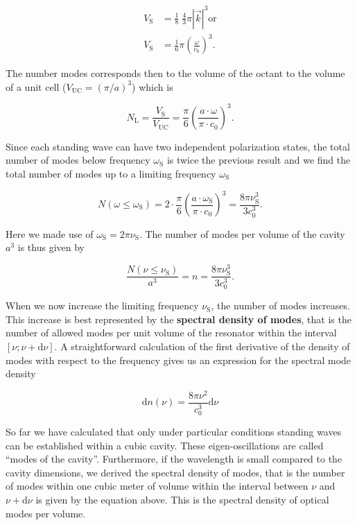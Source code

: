 \documentclass[
  a4paper,
]{book}
\begin{document}
\[
\begin{aligned}
V_{\mathrm{S}} & = \frac{1}{8} \; \frac{4}{3} \pi \left| \vec{k} \right|^3 \mathrm{ or }\\
V_{\mathrm{S}} & = \frac{1}{6} \pi \left( \frac{\omega}{c_0} \right)^3 \mathrm{.}
\end{aligned}
\]

The number modes corresponds then to the volume of the octant to the
volume of a unit cell (\(V_{\mathrm{UC}} = \left( \pi / a \right)^3\))
which is

\[
N_{\mathrm{L}} = \frac{V_{\mathrm{S}}}{V_{\mathrm{UC}}} = \frac{\pi}{6} \left( \frac{a \cdot \omega}{\pi \cdot c_0} \right)^3 \mathrm{.}
\]

Since each standing wave can have two independent polarization states,
the total number of modes below frequency \(\omega_{\mathrm{S}}\) is
twice the previous result and we find the total number of modes up to a
limiting frequency \(\omega_{\mathrm{S}}\)

\[
N \left( \omega \le \omega_{\mathrm{S}} \right) = 2 \cdot \frac{\pi}{6} \left( \frac{a \cdot \omega_{\mathrm{S}}}{\pi \cdot c_0} \right)^3 = \frac{8 \pi \nu_{\mathrm{S}}^3}{3 c_0^3} \mathrm{.}
\]

Here we made use of \(\omega_{\mathrm{S}} = 2 \pi \nu_{\mathrm{S}}\).
The number of modes per volume of the cavity \(a^3\) is thus given by

\[
\frac{N \left( \nu \le \nu_{\mathrm{S}} \right) }{a^3} = n = \frac{8 \pi \nu_{\mathrm{S}}^3}{3 c_0^3} \mathrm{.}
\]

When we now increase the limiting frequency \(\nu_{\mathrm{S}}\), the
number of modes increases. This increase is best represented by the
\textbf{spectral density of modes}, that is the number of allowed modes
per unit volume of the resonator within the interval
\(\left[ \nu ; \nu + \mathrm{d}\nu \right]\). A straightforward
calculation of the first derivative of the density of modes with respect
to the frequency gives us an expression for the spectral mode density

\[
\mathrm{d}n(\nu) = \frac{8 \pi \nu^2}{c_0^3} \mathrm{d}\nu
\]

So far we have calculated that only under particular conditions standing
waves can be established within a cubic cavity. These eigen-oscillations
are called ``modes of the cavity''. Furthermore, if the wavelength is
small compared to the cavity dimensions, we derived the spectral density
of modes, that is the number of modes within one cubic meter of volume
within the interval between \(\nu\) and \(\nu + \mathrm{d}\nu\) is given
by the equation above. This is the spectral density of optical modes per
volume.
\end{document}
